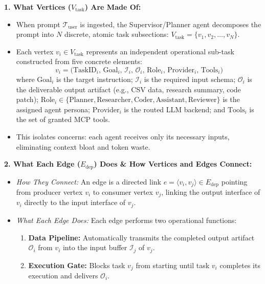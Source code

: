 \documentclass[11pt,a4paper]{article}
\begin{document}
\vspace{0.06em}
\textbf{1. What Vertices ($V_{\text{task}}$) Are Made Of:}
\begin{itemize}[leftmargin=1.5em, itemsep=0.06em, topsep=0.02em]
    \item When prompt $\mathcal{T}_{\text{user}}$ is ingested, the Supervisor/Planner agent decomposes the prompt into $N$ discrete, atomic task subsections: $V_{\text{task}} = \{v_1, v_2, \dots, v_N\}$.
    \item Each vertex $v_i \in V_{\text{task}}$ represents an independent operational sub-task constructed from five concrete elements:
    \begin{equation*}
    v_i = \big(\text{TaskID}_i,\, \text{Goal}_i,\, \mathcal{I}_i,\, \mathcal{O}_i,\, \text{Role}_i,\, \text{Provider}_i,\, \text{Tools}_i\big)
    \end{equation*}
    where $\text{Goal}_i$ is the target instruction; $\mathcal{I}_i$ is the required input schema; $\mathcal{O}_i$ is the deliverable output artifact (e.g., CSV data, research summary, code patch); $\text{Role}_i \in \{\text{Planner}, \text{Researcher}, \text{Coder}, \text{Assistant}, \text{Reviewer}\}$ is the assigned agent persona; $\text{Provider}_i$ is the routed LLM backend; and $\text{Tools}_i$ is the set of granted MCP tools.
    \item This isolates concerns: each agent receives only its necessary inputs, eliminating context bloat and token waste.
\end{itemize}

\vspace{0.06em}
\textbf{2. What Each Edge ($E_{\text{dep}}$) Does \& How Vertices and Edges Connect:}
\begin{itemize}[leftmargin=1.5em, itemsep=0.06em, topsep=0.02em]
    \item \textit{How They Connect:} An edge is a directed link $e = \langle v_i, v_j \rangle \in E_{\text{dep}}$ pointing from producer vertex $v_i$ to consumer vertex $v_j$, linking the output interface of $v_i$ directly to the input interface of $v_j$.
    \item \textit{What Each Edge Does:} Each edge performs two operational functions:
    \begin{enumerate}[leftmargin=1.4em, itemsep=0.02em, topsep=0.01em]
        \item \textbf{Data Pipeline:} Automatically transmits the completed output artifact $\mathcal{O}_i$ from $v_i$ into the input buffer $\mathcal{I}_j$ of $v_j$.
        \item \textbf{Execution Gate:} Blocks task $v_j$ from starting until task $v_i$ completes its execution and delivers $\mathcal{O}_i$.
    \end{enumerate}
\end{itemize}
\end{document}
